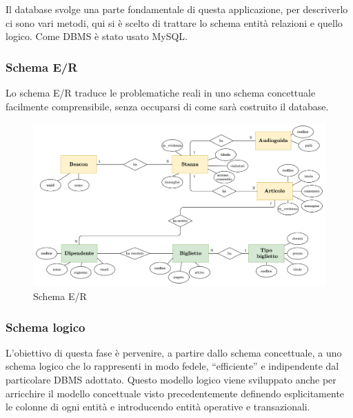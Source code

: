 \documentclass[12pt]{article}
\begin{document}
Il database svolge una parte fondamentale di questa applicazione, per descriverlo ci sono vari metodi, qui si è scelto di trattare lo schema entità relazioni e quello logico. Come DBMS è stato usato MySQL.

\subsubsection{Schema E/R}
Lo schema E/R traduce le problematiche reali in uno  schema concettuale facilmente comprensibile, senza occuparsi di come sarà costruito il database.

\begin{center}
    \begin{figure}[htp]
        \centering
        \includegraphics[width=14cm]{diagrams/er_scheme.png}
        \caption{Schema E/R}
        \label{fig:er}
    \end{figure}
\end{center}

\clearpage

\subsubsection{Schema logico}
L’obiettivo di questa fase è pervenire, a partire dallo schema concettuale, a uno schema logico che
lo rappresenti in modo fedele, “efficiente” e indipendente dal particolare DBMS adottato. Questo modello logico viene sviluppato anche per arricchire il modello concettuale visto precedentemente definendo esplicitamente le colonne di ogni entità e introducendo entità operative e transazionali.
\end{document}
